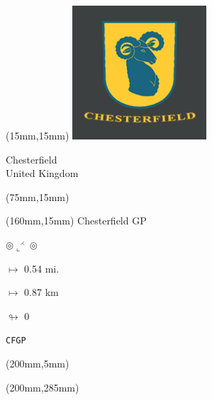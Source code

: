 \begin{textblock*}{50mm}(15mm,15mm)%
\includegraphics[width=50mm]{LG/2015-06-23_00001.png}
\par Chesterfield\\ United Kingdom
\end{textblock*}
\begin{textblock*}{80mm}(75mm,15mm)%
\end{textblock*}
\begin{textblock*}{40mm}(160mm,15mm)%
Chesterfield GP
\par $\circledcirc\llcorner^{\rightthreetimes}\circledcirc$
\Large
\par$\mapsto$ 0.54 mi.
\par$\mapsto$ 0.87 km
\par$\looparrowright$ 0
\par\hfill\tiny\tt CFGP\\
\end{textblock*}
\begin{textblock*}{20mm}(200mm,5mm)%
\fbox{\thepage}
\end{textblock*}
\begin{textblock*}{20mm}(200mm,285mm)%
\fbox{\thepage}
\end{textblock*}
